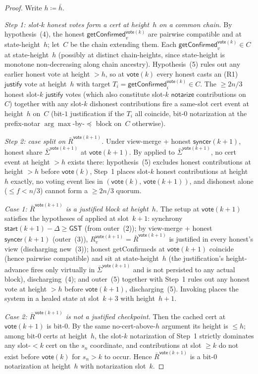 \documentclass{article}
\newcommand{\just}{\ensuremath{\mathsf{justify}}\xspace}
\newcommand{\notar}{\ensuremath{\mathsf{notarize}}\xspace}
\newcommand{\syncer}{\mathsf{syncer}}
\newcommand{\start}{\mathsf{start}}
\newcommand{\vote}{\mathsf{vote}}
\newcommand{\comm}[1]{\bar{#1}}
\newcommand{\getConfirmed}{\textsf{getConfirmed}\xspace}
\theoremstyle{plain}
\theoremstyle{definition}
\theoremstyle{remark}
\newcommand{\GST}{\ensuremath{\mathsf{GST}}}
\begin{document}
\begin{proof}
Write $h \coloneqq \comm{h}$.

\emph{Step 1: slot-$k$ honest votes form a cert at height~$h$ on a common chain.}
By hypothesis~(4), the honest $\getConfirmed_v^{\vote(k)}$ are pairwise compatible and at state-height~$h$; let~$C$ be the chain extending them. Each $\getConfirmed_v^{\vote(k)} \in C$ at state-height~$h$ (possibly at distinct chain-heights, since state-height is monotone non-decreasing along chain ancestry). Hypothesis~(5) rules out any earlier honest vote at height $>h$, so at $\vote(k)$ every honest casts an (R1) \just vote at height~$h$ with target $T_i = \getConfirmed_i^{\vote(k)} \in C$. The $\geq 2n/3$ honest slot-$k$ \just votes (which also constitute slot-$k$ \notar contributions on~$C$) together with any slot-$k$ dishonest contributions fire a same-slot cert event at height~$h$ on~$C$ (bit-$1$ justification if the $T_i$ all coincide, bit-$0$ notarization at the prefix-notar $\arg\max$-by-$\preceq$ block on~$C$ otherwise).

\emph{Step 2: case split on $\comm{R}^{\vote(k+1)}$.}
Under view-merge + honest $\syncer(k+1)$, honest share $\comm{\Sigma}^{\vote(k+1)}$ at $\vote(k+1)$. By  applied to $\comm{\Sigma}^{\vote(k+1)}$, no cert event at height $>h$ exists there: hypothesis~(5) excludes honest contributions at height $>h$ before $\vote(k)$, Step~1 places slot-$k$ honest contributions at height~$h$ exactly, no voting event lies in $(\vote(k),\, \vote(k+1))$, and dishonest alone ($\leq f < n/3$) cannot form a $\geq 2n/3$ quorum.

\emph{Case 1: $\comm{R}^{\vote(k+1)}$ is a justified block at height~$h$.}
The setup at $\vote(k+1)$ satisfies the hypotheses of  applied at slot~$k+1$: synchrony $\start(k+1) - \Delta \geq \GST$ (from outer~(2)); by view-merge + honest $\syncer(k+1)$ (outer~(3)), $R_v^{\vote(k+1)} = \comm{R}^{\vote(k+1)}$ is justified in every honest's view (discharging new~(3)); honest \getConfirmed{}s at $\vote(k+1)$ coincide (hence pairwise compatible) and sit at state-height~$h$ (the justification's height-advance fires only virtually in $\comm{\Sigma}^{\vote(k+1)}$ and is not persisted to any actual block), discharging~(4); and outer~(5) together with Step~1 rules out any honest vote at height $>h$ before $\vote(k+1)$, discharging~(5). Invoking  places the system in a healed state at slot~$k+3$ with height~$h+1$.

\emph{Case 2: $\comm{R}^{\vote(k+1)}$ is not a justified checkpoint.}
Then the cached cert at $\vote(k+1)$ is bit-$0$. By the same no-cert-above-$h$ argument its height is $\leq h$; among bit-$0$ certs at height~$h$, the slot-$k$ notarization of Step~1 strictly dominates any slot-$<k$ cert on the $s_n$ coordinate, and contributions at slot $\geq k$ do not exist before $\vote(k)$ for $s_n > k$ to occur. Hence $\comm{R}^{\vote(k+1)}$ is a bit-$0$ notarization at height~$h$ with notarization slot~$k$.


\end{proof}
\end{document}
